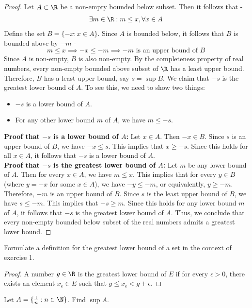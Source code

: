 \documentclass[openany]{book}
\begin{document}
\begin{proof}
    Let $A \subset \R$ be a non-empty bounded below subset. Then it follows that - 
    $$\exists m \in \R: m \leq x, \forall x \in A$$
    Define the set $B = \{-x : x \in A\}$. Since $A$ is bounded below, it follows that $B$ is bounded above by $-m$ - 
    $$m \leq x \implies -x \leq -m \implies -m \text{ is an upper bound of } B$$
    Since $A$ is non-empty, $B$ is also non-empty. By the completeness property of real numbers, every non-empty bounded above subset of $\R$ has a least upper bound. Therefore, $B$ has a least upper bound, say $s = \sup B$. We claim that $-s$ is the greatest lower bound of $A$. To see this, we need to show two things:
    \begin{itemize}
        \item $-s$ is a lower bound of $A$.
        \item For any other lower bound $m$ of $A$, we have $m \leq -s$.
    \end{itemize}
    \textbf{Proof that $-s$ is a lower bound of $A$:} Let $x \in A$. Then $-x \in B$. Since $s$ is an upper bound of $B$, we have $-x \leq s$. This implies that $x \geq -s$. Since this holds for all $x \in A$, it follows that $-s$ is a lower bound of $A$. \\
    \textbf{Proof that $-s$ is the greatest lower bound of $A$:} Let $m$ be any lower bound of $A$. Then for every $x \in A$, we have $m \leq x$. This implies that for every $y \in B$ (where $y = -x$ for some $x \in A$), we have $-y \leq -m$, or equivalently, $y \geq -m$. Therefore, $-m$ is an upper bound of $B$. Since $s$ is the least upper bound of $B$, we have $s \leq -m$. This implies that $-s \geq m$. Since this holds for any lower bound $m$ of $A$, it follows that $-s$ is the greatest lower bound of $A$. Thus, we conclude that every non-empty bounded below subset of the real numbers admits a greatest lower bound.
\end{proof}
\begin{exercise}
    Formulate a definition for the greatest lower bound of a set in the context of exercise 1. 
\end{exercise}
\begin{proof}
    A number $g \in \R$ is the greatest lower bound of $E$ if for every $\epsilon > 0$, there exists an element $x_\epsilon \in E$ such that $g \leq x_\epsilon < g + \epsilon$.
\end{proof}
\begin{exercise}
    Let $A = \{\frac{1}{n} : n \in \N\}$. Find $\sup A$.
\end{exercise}
\end{document}
